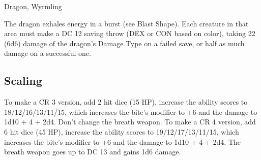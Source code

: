 \begin{DndMonster}[width=\textwidth + 8pt]{Dragon, Wyrmling}
\begin{multicols}{2}
\DndMonsterAttack[
	name=Bite,
	distance=melee,
	type=weapon,
	mod=+4,
	reach=5,
	dmg=\DndDice{1d10 + 2},
	dmg-type=piercing,
	extra={ plus 2 (1d4) damage of the dragon's damage type.}
]

The dragon exhales energy in a burst (see Blast Shape). Each creature in that area must make a DC 12 saving throw (DEX or CON based on color), taking 22 (6d6) damage of the dragon's Damage Type on a failed save, or half as much damage on a successful one.
\subsection{Scaling}
To make a CR 3 version, add 2 hit dice (15 HP), increase the ability scores to 18/12/16/13/11/15, which increases the bite's modifier to +6 and the damage to 1d10 + 4 + 2d4. Don't change the breath weapon.
To make a CR 4 version, add 6 hit dice (45 HP), increase the ability scores to 19/12/17/13/11/15, which increases the bite's modifier to +6 and the damage to 1d10 + 4 + 2d4. The breath weapon goes up to DC 13 and gains 1d6 damage.
\end{multicols}
\end{DndMonster}
